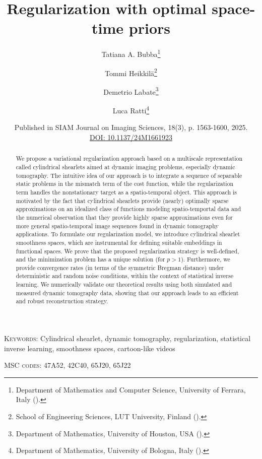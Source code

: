 \documentclass[11pt,a4paper]{article}
\title{Regularization with  optimal  space-time priors }
\date{Published in SIAM Journal on Imaging Sciences, 18(3), p. 1563-1600, 2025.\\ \href{https://doi.org/10.1137/24M1661923}{DOI: 10.1137/24M1661923}}
\author{Tatiana A. Bubba\thanks{Department of Mathematics and Computer Science, University of Ferrara, Italy (\email{tatiana.bubba@unife.it}).}
\and Tommi Heikkil\"a\thanks{School of Engineering Sciences, LUT University, Finland  (\email{tommi.heikkila@lut.fi}).}
\and Demetrio Labate\thanks{Department of Mathematics, University of Houston, USA (\email{dlabate@math.uh.edu}).}
\and Luca Ratti\thanks{Department of Mathematics, University of Bologna, Italy (\email{luca.ratti5@unibo.it}).}
}
\numberwithin{equation}{section}
\begin{document}
\maketitle

\begin{abstract}
We propose a variational regularization approach based on a multiscale representation called cylindrical shearlets aimed at dynamic imaging problems, especially dynamic tomography. The intuitive idea of our approach is to integrate a sequence of separable static problems in the mismatch term of the cost function, while the regularization term handles the nonstationary target as a spatio-temporal object. 
This approach is motivated by the fact that cylindrical shearlets provide (nearly) optimally sparse approximations on an idealized class of functions modeling spatio-temportal data and the numerical observation that they provide highly sparse approximations even for more general spatio-temporal image sequences found in dynamic tomography applications. 
To formulate our regularization model, we introduce cylindrical shearlet smoothness spaces, which are instrumental for defining suitable embeddings in functional spaces. We prove that the proposed regularization strategy is well-defined, and the minimization problem has a unique solution (for $ p > 1$). 
Furthermore, we provide convergence rates (in terms of the symmetric Bregman distance) under deterministic and random noise conditions, within the context of statistical inverse learning. We numerically validate our theoretical results using both simulated and measured dynamic tomography data, showing that our approach leads to an efficient and robust reconstruction strategy.
\end{abstract}


\noindent\textsc{Keywords}: Cylindrical shearlet, dynamic tomography, regularization, statistical inverse learning, smoothness spaces, cartoon-like videos

\medskip
\noindent\textsc{MSC codes}: 
47A52, %
42C40, %
65J20, %
65J22 %
\end{document}
